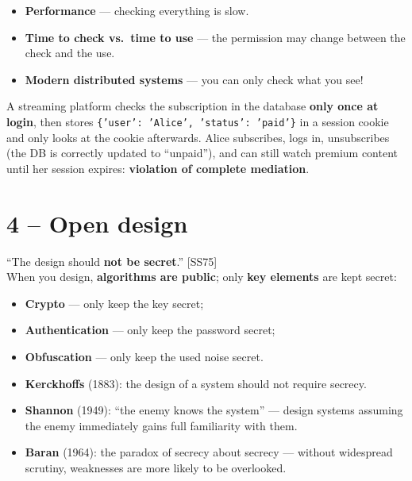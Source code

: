 \begin{warnbox}[title=Difficult to implement]
\begin{itemize}
  \item \textbf{Performance} --- checking everything is slow.
  \item \textbf{Time to check vs.\ time to use} --- the permission may change between
        the check and the use.
  \item \textbf{Modern distributed systems} --- you can only check what you see!
\end{itemize}
\end{warnbox}

\begin{exbox}[title=Missing mediation --- the ``Gold Member'' cookie]
A streaming platform checks the subscription in the database \textbf{only once at
login}, then stores \texttt{\{'user': 'Alice', 'status': 'paid'\}} in a session cookie
and only looks at the cookie afterwards. Alice subscribes, logs in, unsubscribes (the DB
is correctly updated to ``unpaid''), and can still watch premium content until her
session expires: \textbf{violation of complete mediation}.
\end{exbox}

\section{4 -- Open design}

\begin{defnbox}[title=Open design]
``The design should \textbf{not be secret}.'' [SS75] \\
When you design, \textbf{algorithms are public}; only \textbf{key elements} are kept
secret:
\begin{itemize}
  \item \textbf{Crypto} --- only keep the key secret;
  \item \textbf{Authentication} --- only keep the password secret;
  \item \textbf{Obfuscation} --- only keep the used noise secret.
\end{itemize}
\end{defnbox}

\begin{rembox}[title=Historical formulations]
\begin{itemize}
  \item \textbf{Kerckhoffs} (1883): the design of a system should not require secrecy.
  \item \textbf{Shannon} (1949): ``the enemy knows the system'' --- design systems
        assuming the enemy immediately gains full familiarity with them.
  \item \textbf{Baran} (1964): the paradox of secrecy about secrecy --- without
        widespread scrutiny, weaknesses are more likely to be overlooked.
\end{itemize}
\end{rembox}

